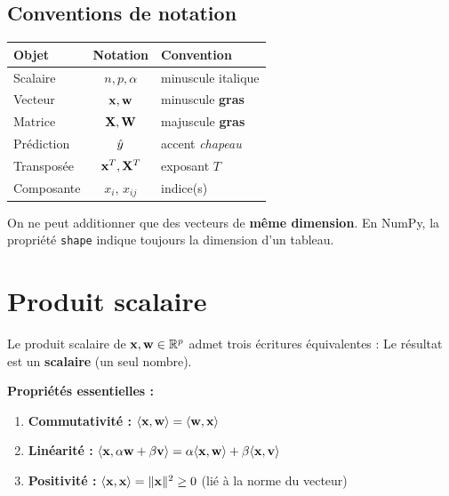 \subsection{Conventions de notation}

\begin{center}
\begin{tabularx}{0.88\textwidth}{l c X}
    \toprule
    \textbf{Objet} & \textbf{Notation} & \textbf{Convention} \\
    \midrule
    Scalaire       & $n, p, \alpha$ & minuscule italique \\
    Vecteur        & $\mathbf{x}, \mathbf{w}$ & minuscule \textbf{gras} \\
    Matrice        & $\mathbf{X}, \mathbf{W}$ & majuscule \textbf{gras} \\
    Pr\'{e}diction & $\hat{y}$ & accent \textit{chapeau} \\
    Transpos\'{e}e & $\mathbf{x}^T, \mathbf{X}^T$ & exposant $T$ \\
    Composante     & $x_i$, $x_{ij}$ & indice(s) \\
    \bottomrule
\end{tabularx}
\end{center}

\begin{attentionbox}[Dimension]
    On ne peut additionner que des vecteurs de \textbf{m\^{e}me dimension}.
    En NumPy, la propri\'{e}t\'{e} \texttt{shape} indique toujours la dimension d'un tableau.
\end{attentionbox}

\section{Produit scalaire}

\begin{definitionbox}
    Le produit scalaire de $\mathbf{x}, \mathbf{w} \in \mathbb{R}^p$ admet trois \'{e}critures
    \'{e}quivalentes :
    Le r\'{e}sultat est un \textbf{scalaire} (un seul nombre).
\end{definitionbox}

\textbf{Propri\'{e}t\'{e}s essentielles :}
\begin{enumerate}
    \item \textbf{Commutativit\'{e} :} $\langle \mathbf{x}, \mathbf{w} \rangle = \langle \mathbf{w}, \mathbf{x} \rangle$
    \item \textbf{Lin\'{e}arit\'{e} :}
        $\langle \mathbf{x}, \alpha\mathbf{w} + \beta\mathbf{v} \rangle
        = \alpha\langle \mathbf{x}, \mathbf{w} \rangle + \beta\langle \mathbf{x}, \mathbf{v} \rangle$
    \item \textbf{Positivit\'{e} :}
        $\langle \mathbf{x}, \mathbf{x} \rangle = \|\mathbf{x}\|^2 \geq 0$ \enspace
        (li\'{e} \`{a} la norme du vecteur)
\end{enumerate}

